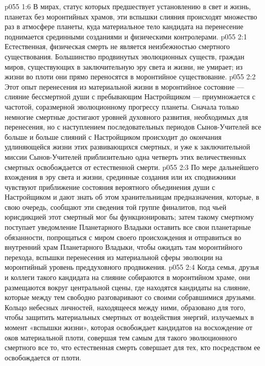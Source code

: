 \vs p055 1:6 \pc В мирах, статус которых предшествует установлению в свет и жизнь, планетах без моронтийных храмов, эти вспышки слияния происходят множество раз в атмосфере планеты, куда материальное тело кандидата на перенесение поднимается срединными созданиями и физическими контролерами.
\vs p055 2:1 Естественная, физическая смерть не является неизбежностью смертного существования. Большинство продвинутых эволюционных существ, граждан миров, существующих в заключительную эру света и жизни, не умирает; из жизни во плоти они прямо переносятся в моронтийное существование.
\vs p055 2:2 Этот опыт перенесения из материальной жизни в моронтийное состояние --- слияние бессмертной души с пребывающим Настройщиком --- приумножается с частотой, соразмерной эволюционному прогрессу планеты. Сначала только немногие смертные достигают уровней духовного развития, необходимых для перенесения, но с наступлением последовательных периодов Сынов\hyp{}Учителей все больше и больше слияний с Настройщиком происходит до окончания удлиняющейся жизни этих развивающихся смертных, и уже к заключительной миссии Сынов\hyp{}Учителей приблизительно одна четверть этих величественных смертных освобождается от естественной смерти.
\vs p055 2:3 \pc По мере дальнейшего вхождения в эру света и жизни, срединные создания или их сподвижники чувствуют приближение состояния вероятного объединения души с Настройщиком и дают знать об этом хранительницам предназначения, которые, в свою очередь, сообщают эти сведения той группе финалитов, под чьей юрисдикцией этот смертный мог бы функционировать; затем такому смертному поступает уведомление Планетарного Владыки оставить все свои планетарные обязанности, попрощаться с миром своего происхождения и отправиться во внутренний храм Планетарного Владыки, чтобы ожидать там моронтийного перехода, вспышки перенесения из материальной сферы эволюции на моронтийный уровень преддуховного продвижения.
\vs p055 2:4 \pc Когда семья, друзья и коллеги такого кандидата на слияние собираются в моронтийном храме, они размещаются вокруг центральной сцены, где находятся кандидаты на слияние, которые между тем свободно разговаривают со своими собравшимися друзьями. Кольцо небесных личностей, находящееся между ними, образовано для того, чтобы защитить материальных смертных от воздействия энергий, излучаемых в момент «вспышки жизни», которая освобождает кандидатов на восхождение от оков материальной плоти, совершая тем самым для такого эволюционного смертного все то, что естественная смерть совершает для тех, кто посредством ее освобождается от плоти.
